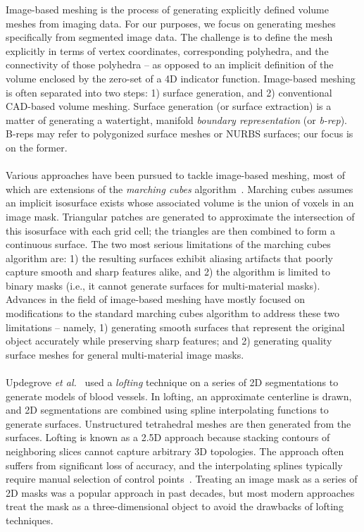 %
Image-based meshing is the process of generating explicitly defined volume meshes from imaging data. For our purposes, we focus on generating meshes specifically from segmented image data. The challenge is to define the mesh explicitly in terms of vertex coordinates, corresponding polyhedra, and the connectivity of those polyhedra -- as opposed to an implicit definition of the volume enclosed by the zero-set of a 4D indicator function. Image-based meshing is often separated into two steps: 1) surface generation, and 2) conventional CAD-based volume meshing. Surface generation (or surface extraction) is a matter of generating a watertight, manifold \textit{boundary representation} (or \textit{b-rep}). B-reps may refer to polygonized surface meshes or NURBS surfaces; our focus is on the former. \\ \\
%
Various approaches have been pursued to tackle image-based meshing, most of which are extensions of the \textit{marching cubes} algorithm~\cite{lorensen_1987}. Marching cubes assumes an implicit isosurface exists whose associated volume is the union of voxels in an image mask. Triangular patches are generated to approximate the intersection of this isosurface with each grid cell; the triangles are then combined to form a continuous surface. The two most serious limitations of the marching cubes algorithm are: 1) the resulting surfaces exhibit aliasing artifacts that poorly capture smooth and sharp features alike, and 2) the algorithm is limited to binary masks (i.e., it cannot generate surfaces for multi-material masks). Advances in the field of image-based meshing have mostly focused on modifications to the standard marching cubes algorithm to address these two limitations -- namely, 1) generating smooth surfaces that represent the original object accurately while preserving sharp features; and 2) generating quality surface meshes for general multi-material image masks. \\ \\ 
%
Updegrove \textit{et al.}~\cite{updegrove_2016} used a \textit{lofting} technique on a series of 2D segmentations to generate models of blood vessels. In lofting, an approximate centerline is drawn, and 2D segmentations are combined using spline interpolating functions to generate surfaces. Unstructured tetrahedral meshes are then generated from the surfaces. Lofting is known as a 2.5D approach because stacking contours of neighboring slices cannot capture arbitrary 3D topologies. The approach often suffers from significant loss of accuracy, and the interpolating splines typically require manual selection of control points~\cite{young_2008}. Treating an image mask as a series of 2D masks was a popular approach in past decades, but most modern approaches treat the mask as a three-dimensional object to avoid the drawbacks of lofting techniques. \\ \\
